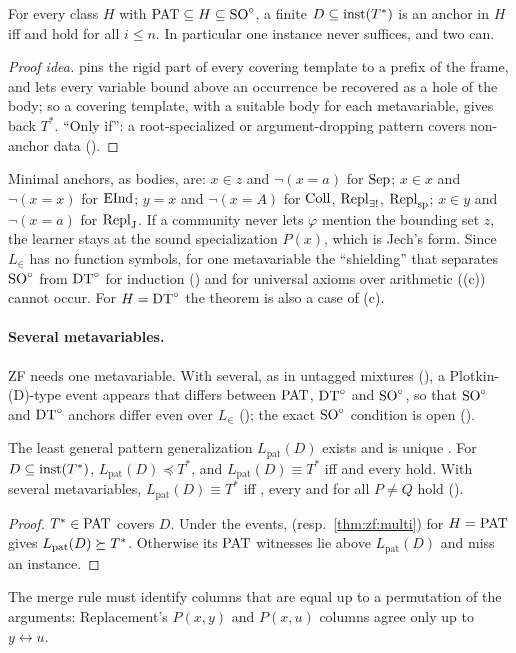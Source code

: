 \begin{theorem}\label{thm:zf:anchor}
For every class $H$ with $\mathrm{PAT}\subseteq H\subseteq\mathrm{SO}^{\circ}$, a finite $D\subseteq\mathrm{inst}(T^*)$ is an anchor in $H$ iff
\evR{} and  hold for all $i\le n$. In particular one instance never suffices, and two can.
\end{theorem}
\begin{proof}[Proof idea]
\evR{} pins the rigid part of every covering template to a prefix of the frame, and  lets every variable bound
above an occurrence be recovered as a hole of the body; so a covering template, with a suitable body for each
metavariable, gives back $T^*$. ``Only if'': a root-specialized or argument-dropping pattern covers non-anchor data
().
\end{proof}
Minimal anchors, as bodies, are: $x\in z$ and $\neg(x=a)$ for $\mathrm{Sep}$; $x\in x$ and $\neg(x=x)$ for $\mathrm{EInd}$; $y=x$ and
$\neg(x=A)$ for $\mathrm{Coll}$, $\mathrm{Repl}_{\exists!}$, $\mathrm{Repl}_{\mathrm{sp}}$; $x\in y$ and $\neg(x=a)$ for $\mathrm{Repl}_{\mathrm{J}}$. If a community never lets $\varphi$
mention the bounding set $z$, the learner stays at the sound specialization $P(x)$, which is Jech's form. Since
$L_\in$ has no function symbols, for one metavariable the ``shielding'' that separates $\mathrm{SO}^{\circ}$ from $\mathrm{DT}^{\circ}$ for induction
() and for universal axioms over arithmetic ((c)) cannot occur. For $H=\mathrm{DT}^{\circ}$ the
theorem is also a case of (c).

\paragraph{Several metavariables.} ZF needs one metavariable. With several, as in untagged mixtures
(), a Plotkin-(D)-type event appears that differs between $\mathrm{PAT}$, $\mathrm{DT}^{\circ}$ and $\mathrm{SO}^{\circ}$, so that $\mathrm{SO}^{\circ}$ and
$\mathrm{DT}^{\circ}$ anchors differ even over $L_\in$ (); the exact $\mathrm{SO}^{\circ}$ condition is open ().

\begin{corollary}\label{cor:zf:patlgg}
The least general pattern generalization $L_{\mathrm{pat}}(D)$ exists and is unique
\citep{pfenning1991unification,baumgartner2017higher}. For $D\subseteq\mathrm{inst}(T^*)$, $L_{\mathrm{pat}}(D)\preceq T^*$,
and $L_{\mathrm{pat}}(D)\equiv T^*$ iff \evR{} and every  hold. With several metavariables,
$L_{\mathrm{pat}}(D)\equiv T^*$ iff , every  and  for all $P\ne Q$ hold
().
\end{corollary}
\begin{proof}
$T^*\in\mathrm{PAT}$ covers $D$. Under the events,  (resp.\ \ref{thm:zf:multi}) for $H=\mathrm{PAT}$ gives
$L_{\mathrm{pat}}(D)\succeq T^*$. Otherwise its $\mathrm{PAT}$ witnesses lie above $L_{\mathrm{pat}}(D)$ and miss an instance.
\end{proof}
The merge rule must identify columns that are equal up to a permutation of the arguments: Replacement's $P(x,y)$ and
$P(x,u)$ columns agree only up to $y\leftrightarrow u$.

